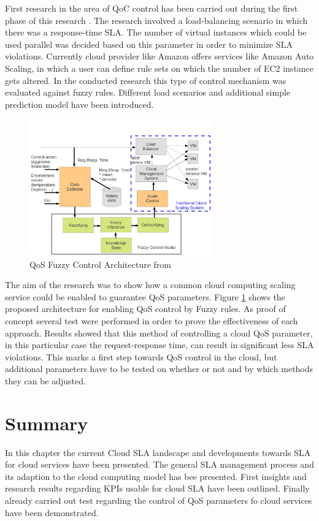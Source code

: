 First research in the area of QoC control has been carried out during the first phase of this research \cite{fuzzyQoS}. The research involved a load-balancing scenario in which there was a response-time SLA. The number of virtual instances which could be used parallel was decided based on this parameter in order to minimize SLA violations. Currently cloud provider like Amazon offers services like  Amazon Auto Scaling, in which a user can define rule sets on which the number of EC2 instance gets altered. In the conducted research this type of control mechanism was evaluated against fuzzy rules. Different load scenarios and additional simple prediction model have been introduced.

 \begin{figure}[ht]
 \begin{center}
 \includegraphics[width=0.7\textwidth]{chapters/chapter3/fig/architecture.png}
 \caption{QoS Fuzzy Control Architecture from \cite{fuzzyQoS} }
 \label{fig:fuzzy}
 \end{center}
 \end{figure}

 The aim of the research was to show how a common cloud computing scaling service could be enabled to guarantee QoS parameters. Figure \ref{fig:fuzzy} shows the proposed architecture for enabling QoS control by Fuzzy rules. As proof of concept several test were performed in order to prove the effectiveness of each approach. Results showed that this method of controlling a cloud QoS parameter, in this particular case the request-response time, can result in significant less SLA violations. This marks a first step towards QoS control in the cloud, but additional parameters have to be tested on whether or not and by which methods they can be adjusted.

 
 
  \section{Summary}
In this chapter the current Cloud SLA landscape and developments towards SLA for cloud services have been presented. The general SLA management process and its adaption to the cloud computing model has bee presented. First insights and research results regarding KPIs usable for cloud SLA have been outlined. Finally already carried out test regarding the control of QoS parameters fo cloud services have been demonstrated.